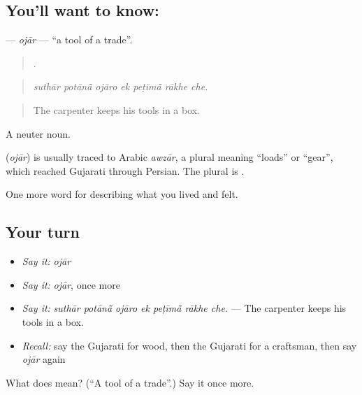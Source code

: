 \subsection*{You'll want to know: }
\textbf{} — \emph{ojār} — \textquotedblleft{}a tool of a trade\textquotedblright{}.

\begin{quote}
      .
\end{quote}

\begin{quote}
\emph{suthār potānā̃ ojāro ek peṭīmā̃ rākhe che.}
\end{quote}

\begin{quote}
The carpenter keeps his tools in a box.
\end{quote}

A neuter noun.

\begin{cousinweb}
\textbf{} (\emph{ojār}) is usually traced to Arabic \emph{awzār}, a plural meaning \textquotedblleft{}loads\textquotedblright{} or \textquotedblleft{}gear\textquotedblright{}, which reached Gujarati through Persian. The plural is \textbf{}.
\end{cousinweb}

\begin{grammarlens}[title={What you've built}]
One more word for describing what you lived and felt.
\end{grammarlens}

\subsection*{Your turn}
\begin{itemize}
\raggedright
  \item \emph{Say it:} \emph{ojār}
  \item \emph{Say it:} \emph{ojār}, once more
  \item \emph{Say it:} \emph{suthār potānā̃ ojāro ek peṭīmā̃ rākhe che.} — The carpenter keeps his tools in a box.
  \item \emph{Recall:} say the Gujarati for wood, then the Gujarati for a craftsman, then say \emph{ojār} again
\end{itemize}

\begin{tcolorbox}[breakable,colback=teal!4,colframe=teal!35!black,title={Before you move on}]
What does  mean? (\textquotedblleft{}A tool of a trade\textquotedblright{}.) Say it once more.
\end{tcolorbox}
